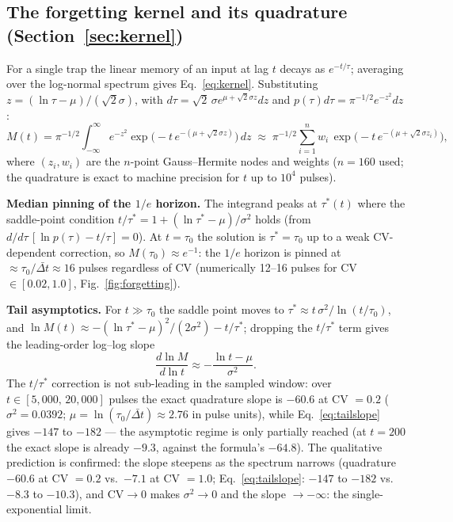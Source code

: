 \documentclass[11pt]{article}
\newcommand{\Dt}{\Delta t}
\begin{document}
\subsection{The forgetting kernel and its quadrature (Section~\ref{sec:kernel})}
\label{app:quadrature}

For a single trap the linear memory of an input at lag $t$ decays as
$e^{-t/\tau}$; averaging over the log-normal spectrum gives
Eq.~\eqref{eq:kernel}. Substituting $z=(\ln\tau-\mu)/(\sqrt{2}\sigma)$, with
$d\tau=\sqrt{2}\,\sigma e^{\mu+\sqrt{2}\sigma z}dz$ and
$p(\tau)d\tau=\pi^{-1/2}e^{-z^2}dz$:
\begin{equation}
M(t)=\pi^{-1/2}\int_{-\infty}^{\infty}e^{-z^2}\exp\!\big(-t\,e^{-(\mu+\sqrt{2}
\sigma z)}\big)\,dz \;\approx\; \pi^{-1/2}\sum_{i=1}^{n} w_i\,\exp\!\big(-t\,e^{-
(\mu+\sqrt{2}\sigma z_i)}\big),
\label{eq:quadrature}
\end{equation}
where $(z_i,w_i)$ are the $n$-point Gauss--Hermite nodes and weights ($n=160$
used; the quadrature is exact to machine precision for $t$ up to $10^4$
pulses).

\textbf{Median pinning of the $1/e$ horizon.} The integrand peaks at
$\tau^*(t)$ where the saddle-point condition
$t/\tau^*=1+(\ln\tau^*-\mu)/\sigma^2$ holds (from
$d/d\tau\,[\ln p(\tau)-t/\tau]=0$). At $t=\tau_0$ the solution is
$\tau^*=\tau_0$ up to a weak CV-dependent correction, so $M(\tau_0)\approx
e^{-1}$: the $1/e$ horizon is pinned at $\approx\tau_0/\bar{\Dt}\approx
16$ pulses regardless of CV (numerically 12--16 pulses for CV
$\in[0.02,1.0]$, Fig.~\ref{fig:forgetting}).

\textbf{Tail asymptotics.} For $t\gg\tau_0$ the saddle point moves to
$\tau^*\approx t\,\sigma^2/\ln(t/\tau_0)$, and
$\ln M(t)\approx-(\ln\tau^*-\mu)^2/(2\sigma^2)-t/\tau^*$; dropping the
$t/\tau^*$ term gives the leading-order log--log slope
\begin{equation}
\frac{d\ln M}{d\ln t}\approx -\frac{\ln t-\mu}{\sigma^2}.
\label{eq:tailslope}
\end{equation}
The $t/\tau^*$ correction is not sub-leading in the sampled window: over
$t\in[5{,}000,\,20{,}000]$ pulses the exact quadrature slope is $-60.6$ at
CV $=0.2$ ($\sigma^2=0.0392$; $\mu=\ln(\tau_0/\bar{\Dt})\approx2.76$ in pulse
units), while Eq.~\eqref{eq:tailslope} gives $-147$ to $-182$ --- the
asymptotic regime is only partially reached (at $t=200$ the exact slope is
already $-9.3$, against the formula's $-64.8$). The qualitative prediction is
confirmed: the slope steepens as the spectrum narrows (quadrature $-60.6$ at
CV $=0.2$ vs.\ $-7.1$ at CV $=1.0$; Eq.~\eqref{eq:tailslope}: $-147$ to
$-182$ vs.\ $-8.3$ to $-10.3$), and CV$\to0$ makes $\sigma^2\to0$ and the
slope $\to-\infty$: the single-exponential limit.
\end{document}
